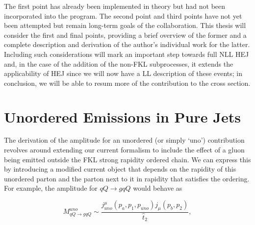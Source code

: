 The first point has already been implemented in theory but had not been incorporated into the program. The second point and third points have not yet been attempted but remain long-term goals of the collaboration. This thesis will consider the first and final points, providing a brief overview of the former and a complete description and derivation of the author's individual work for the latter. Including such considerations will mark an important step towards full NLL HEJ and, in the case of the addition of the non-FKL subprocesses, it extends the applicability of HEJ since we will now have a LL description of these events; in conclusion, we will be able to resum more of the contribution to the cross section. 

\section{Unordered Emissions in Pure Jets}
The derivation of the amplitude for an unordered (or simply `uno') contribution revolves around extending our current formalism to include the effect of a gluon being emitted outside the FKL strong rapidity ordered chain. We can express this by introducing a modified current object that depends on the rapidity of this unordered parton and the parton next to it in rapidity that satisfies the ordering. For example, the amplitude for $qQ \to gqQ$ would behave as

\begin{equation}
M_{qQ \to gqQ}^{uno} \sim \frac{j^\mu_{uno}(p_a,p_1,p_{uno})j_\mu(p_b,p_2)}{\hat{t}_2},
\label{eqn:uno}
\end{equation}

